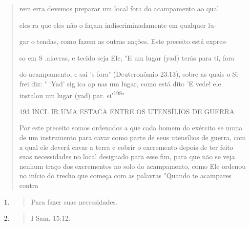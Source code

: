 \begin{quote}
rem erra devemos preparar um local fora do acampamento ao qual

eles ra que eles não o façam indiscriminadamente em qualquer lu-

gar o tendas, como fazem as outras nações. Este preceito está expres-

so em S .alavras, e tecido seja Ele, "E um lugar (yad) terás para ti,
fora

do acampamento, e sai 's fora" (Deuteronômio 23:13), sobre as quais o
Si-frei diz: " `Yad' sig ica ap nas um lugar, como está dito 'E vede!
ele instalou um lugar (yad) par. si'\textsuperscript{198}"

193 INCL IR UMA ESTACA ENTRE OS UTENSÍLIOS DE GUERRA

Por este preceito somos ordenados a que cada homem do exército se muna
de um instrumento para cavar como parte de seus utensílios de guer­ra,
com a qual ele deverá cavar a terra e cobrir o excremento depois de ter
feito suas necessidades no local designado para esse fim, para que não
se veja ne­nhum traço dos excrementos no solo do acampamento, como Ele
ordenou no início do trecho que começa com as palavras "Quando te
acampares contra
\end{quote}

\begin{enumerate}
\def\labelenumi{\arabic{enumi}.}
\setcounter{enumi}{196}
\item
  \begin{quote}
  Para fazer suas necessidades.
  \end{quote}
\item
  \begin{quote}
  I Sam. 15:12.
  \end{quote}
\end{enumerate}

